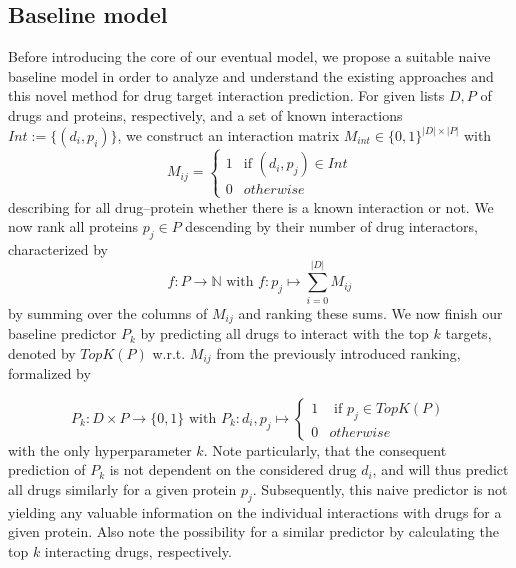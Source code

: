 \documentclass{bioinfo}
\begin{document}
\subsection{Baseline model}
Before introducing the core of our eventual model, we propose a suitable naive baseline model in order to analyze and understand the existing approaches and this novel method for drug target interaction prediction. For given lists $D, P$ of drugs and proteins, respectively, and a set of known interactions $Int := \{(d_i, p_i) \}$, we construct an interaction matrix $M_{int}\in\{0,1\}^{|D|\times|P|}$ with 
\begin{equation*}
	M_{ij} = \begin{cases}
		1 & \text{if } (d_i, p_j)\in Int\\
		0 & otherwise
	\end{cases}
\end{equation*}
describing for all drug--protein whether there is a known interaction or not. We now rank all proteins $p_j\in P$ descending by their number of drug interactors, characterized by 
\begin{equation*}
	f: P \rightarrow \mathbb{N} \text{ with } f:p_j \mapsto \sum_{i=0}^{|D|}M_{ij}
\end{equation*}
by summing over the columns of $M_{ij}$ and ranking these sums.
We now finish our baseline predictor $P_k$ by predicting all drugs to interact with the top $k$ targets, denoted by $TopK(P)$ w.r.t. $M_{ij}$ from the previously introduced ranking, formalized by 

\begin{equation*}
	P_k: D\times P \rightarrow \{0,1\} \text{ with } P_k: d_i, p_j \mapsto \begin{cases}
		1 & \text{ if }p_j \in TopK(P)\\
		0 & otherwise
	\end{cases}
\end{equation*}
with the only hyperparameter $k$. Note particularly, that the consequent prediction of $P_k$ is not dependent on the considered drug $d_i$, and will thus predict all drugs similarly for a given protein $p_j$. Subsequently, this naive predictor is not yielding any valuable information on the individual interactions with drugs for a given protein. Also note the possibility for a similar predictor by calculating the top $k$ interacting drugs, respectively.
\end{document}
